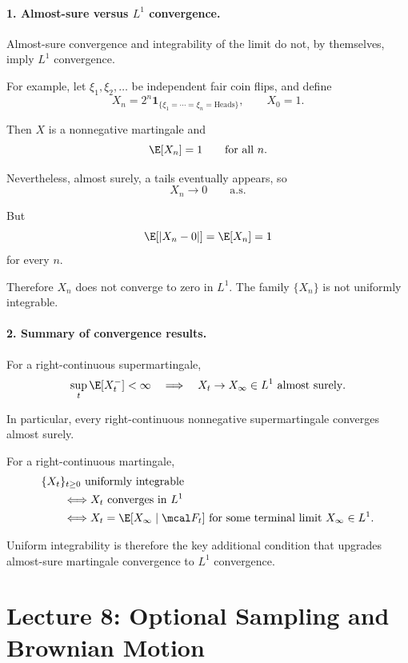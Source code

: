 \paragraph{1. Almost-sure versus $L^1$ convergence.}

Almost-sure convergence and integrability of the
limit do not, by themselves, imply $L^1$ convergence.

For example, let $\xi_1,\xi_2,\ldots$ be independent
fair coin flips, and define
\[
    X_n
    =2^n\mathbf1_{\{
        \xi_1=\cdots=\xi_n=\text{Heads}
    \}},
    \qquad X_0=1.
\]

Then $X$ is a nonnegative martingale and
\[
    \E[X_n]=1
    \qquad\text{for all }n.
\]

Nevertheless, almost surely, a tails eventually
appears, so
\[
    X_n\to0
    \qquad\text{a.s.}
\]

But
\[
    \E[|X_n-0|]=\E[X_n]=1
\]
for every $n$.

Therefore $X_n$ does not converge to zero in $L^1$.
The family $\{X_n\}$ is not uniformly integrable.

\paragraph{2. Summary of convergence results.}

For a right-continuous supermartingale,
\[
    \sup_t\E[X_t^-]<\infty
    \quad\Longrightarrow\quad
    X_t\to X_\infty\in L^1
    \text{ almost surely}.
\]

In particular, every right-continuous nonnegative
supermartingale converges almost surely.

For a right-continuous martingale,
\[
\begin{aligned}
    &\{X_t\}_{t\geq0}\text{ uniformly integrable}\\
    &\qquad\Longleftrightarrow
    X_t\text{ converges in }L^1\\
    &\qquad\Longleftrightarrow
    X_t=\E[X_\infty\mid\mcal F_t]
    \text{ for some terminal limit }X_\infty\in L^1.
\end{aligned}
\]

Uniform integrability is therefore the key
additional condition that upgrades almost-sure
martingale convergence to $L^1$ convergence.


\section{Lecture 8: Optional Sampling and Brownian Motion}

